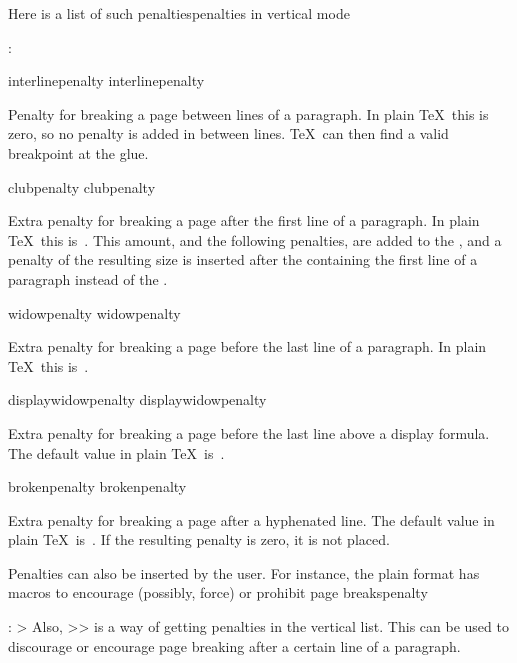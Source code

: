 Here is a list of such penalties\term penalties in vertical mode\par:
\invent
\item interlinepenalty 
      \csterm interlinepenalty\par
      Penalty for breaking a page between lines of a paragraph. 
      In plain \TeX\ this is zero, so no penalty is added in
      between lines. \TeX\ can then find a valid breakpoint at the
       glue.

\item clubpenalty 
      \csterm clubpenalty\par
      Extra penalty for breaking a page after the first line of a paragraph. 
      In plain \TeX\ this is~.
      This amount, and the following penalties, are 
      added to the , and
      a penalty of the resulting size is inserted after the
       containing the first line of a paragraph
      instead of the .

\item widowpenalty 
      \csterm widowpenalty\par
      Extra penalty for breaking a page before the last line of a paragraph. 
      In plain \TeX\ this is~.

\item displaywidowpenalty 
      \csterm displaywidowpenalty\par
      Extra penalty for breaking a page before the last line 
      above a display formula. The default value in plain \TeX\
      is~.

\item brokenpenalty 
      \csterm brokenpenalty \par
      Extra penalty for breaking a page after a hyphenated line. 
      The default value in plain \TeX\ is~\n{100}.
\inventstop
If the resulting penalty is zero, it is not placed.

Penalties can also be inserted by the user. For instance,
the plain format has macros to encourage (possibly, force)
or prohibit page breaks\csterm penalty\par:
\Ver>
\def\break{\penalty-10000 }        %
\def\nobreak{\penalty10000 }       %
\def\goodbreak{\par\penalty-500 }  %
Also, \ver>> is a way of getting
penalties in the vertical list. This can be used to
discourage or encourage page breaking after a certain
line of a paragraph.

